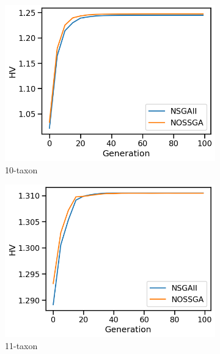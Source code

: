 \begin{figure}[!htbp]
	\centering
	\begin{adjustwidth}{-1cm}{-1cm}
		\begin{subfigure}[b]{0.4\textwidth}
			\includegraphics[width=\textwidth]{Figure/10-taxon_hv}
			\caption{10-taxon}
		\end{subfigure}%
		\begin{subfigure}[b]{0.4\textwidth}
			\includegraphics[width=\textwidth]{Figure/11-taxon_hv}
			\caption{11-taxon}
		\end{subfigure}%
		\begin{subfigure}[b]{0.4\textwidth}

\end{subfigure}
\end{adjustwidth}
\end{figure}
